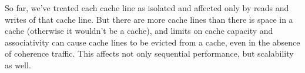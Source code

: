 

So far, we've treated each cache line as isolated and affected only by
reads and writes of that cache line.  But there are more cache lines
than there is space in a cache (otherwise it wouldn't be a cache), and
limits on cache capacity and associativity can cause cache lines to be
evicted from a cache, even in the absence of coherence traffic.  This
affects not only sequential performance, but scalability as well.
